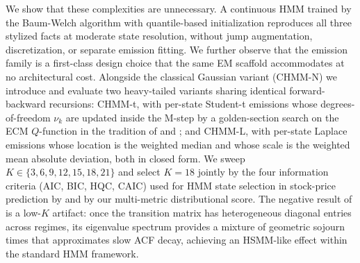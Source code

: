 We show that these complexities are unnecessary.
A continuous HMM trained by the Baum-Welch algorithm \cite{baum1970maximization, rabiner1986introduction} with quantile-based initialization reproduces all three stylized facts at moderate state resolution, without jump augmentation, discretization, or separate emission fitting.
We further observe that the emission family is a first-class design choice that the same EM scaffold accommodates at no architectural cost.
Alongside the classical Gaussian variant (CHMM-N) we introduce and evaluate two heavy-tailed variants sharing identical forward-backward recursions: CHMM-t, with per-state Student-t emissions whose degrees-of-freedom $\nu_k$ are updated inside the M-step by a golden-section search on the ECM $Q$-function in the tradition of \citet{peel2000robust} and \citet{liu1995ml}; and CHMM-L, with per-state Laplace emissions whose location is the weighted median and whose scale is the weighted mean absolute deviation, both in closed form.
We sweep $K \in \{3, 6, 9, 12, 15, 18, 21\}$ and select $K = 18$ jointly by the four information criteria (AIC, BIC, HQC, CAIC) used for HMM state selection in stock-price prediction by \citet{nguyen2018hidden} and by our multi-metric distributional score.
The negative result of \citet{ryden1998stylized} is a low-$K$ artifact: once the transition matrix has heterogeneous diagonal entries across regimes, its eigenvalue spectrum provides a mixture of geometric sojourn times that approximates slow ACF decay, achieving an HSMM-like effect within the standard HMM framework.

